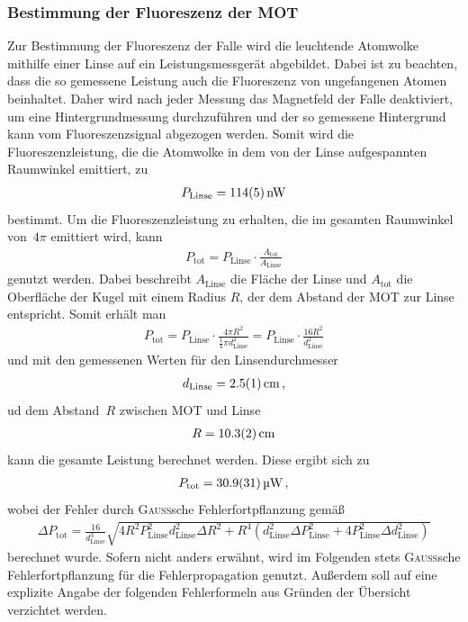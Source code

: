 \documentclass[11pt, a4paper]{article}
\numberwithin{equation}{section}
\begin{document}
\subsubsection{Bestimmung der Fluoreszenz der MOT}
\label{sec:fluoreszenz}
Zur Bestimmung der Fluoreszenz der Falle wird die leuchtende Atomwolke mithilfe einer Linse auf ein Leistungsmessgerät abgebildet.
Dabei ist zu beachten, dass die so gemessene Leistung auch die Fluoreszenz von ungefangenen Atomen beinhaltet.
Daher wird nach jeder Messung das Magnetfeld der Falle deaktiviert, um eine Hintergrundmessung durchzuführen und der so gemessene Hintergrund kann vom Fluoreszenzsignal abgezogen werden.
Somit wird die Fluoreszenzleistung, die die Atomwolke in dem von der Linse aufgespannten Raumwinkel emittiert, zu
\begin{align*}
	P_\mathrm{Linse} = \SI{114 +- 5}{nW}
\end{align*}
bestimmt.
Um die Fluoreszenzleistung zu erhalten, die im gesamten Raumwinkel von~$4\pi$ emittiert wird, kann
\begin{align*}
	P_\mathrm{tot} = P_\mathrm{Linse} \cdot \frac{A_\mathrm{tot}}{A_\mathrm{Linse}}
\end{align*}
genutzt werden.
Dabei beschreibt $A_\mathrm{Linse}$ die Fläche der Linse und $A_\mathrm{tot}$ die Oberfläche der Kugel mit einem Radius $R$, der dem Abstand der MOT zur Linse entspricht.
Somit erhält man
\begin{align*}
	P_\mathrm{tot} = P_\mathrm{Linse} \cdot \frac{4 \pi R^2}{\frac{1}{4} \pi d_\mathrm{Linse}^2} = P_\mathrm{Linse} \cdot \frac{16 R^2}{d_\mathrm{Linse}^2}
\end{align*}
und mit den gemessenen Werten für den Linsendurchmesser
\begin{align*}
	d_\mathrm{Linse} = \SI{2.5 +- 0.1}{cm} \, \text{,}
\end{align*}
ud dem Abstand~$R$ zwischen MOT und Linse
\begin{align*}
	R = \SI{10.3 +- 0.2}{cm}
\end{align*}
kann die gesamte Leistung berechnet werden.
Diese ergibt sich zu
\begin{align*}
	P_\mathrm{tot} = \SI{30.9 +- 3.1}{\micro\watt} \, \text{,}
\end{align*}
wobei der Fehler durch \textsc{Gauß}sche Fehlerfortpflanzung gemäß
\begin{align*}
	\Delta P_\mathrm{tot} = \frac{16}{d_\mathrm{Linse}^3} \sqrt{4 R^2 P_\mathrm{Linse}^2 d_\mathrm{Linse}^2 \Delta R^2 + R^4 \left( d_\mathrm{Linse}^2 \Delta P_\mathrm{Linse}^2 + 4 P_\mathrm{Linse}^2 \Delta d_\mathrm{Linse}^2 \right)}
\end{align*}
berechnet wurde.
Sofern nicht anders erwähnt, wird im Folgenden stets \textsc{Gauß}sche Fehlerfortpflanzung für die Fehlerpropagation genutzt.
Außerdem soll auf eine explizite Angabe der folgenden Fehlerformeln aus Gründen der Übersicht verzichtet werden.
\end{document}
